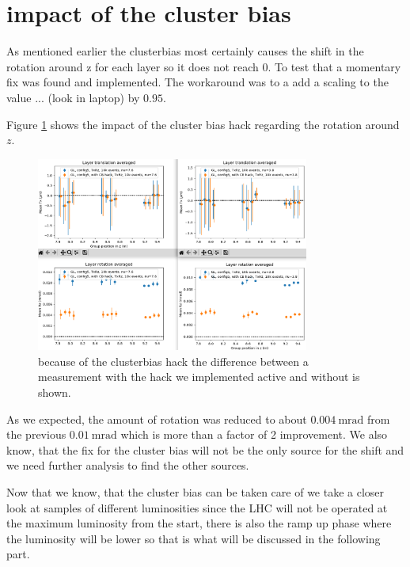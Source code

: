 \section{impact of the cluster bias}

As mentioned earlier the clusterbias most certainly causes the shift in the rotation around z for each layer so it does not reach 0.
To test that a momentary fix was found and implemented. The workaround was to a add a scaling to the value ... (look in laptop) by $\num{0.95}$.

Figure \ref{fig:cbhack_on_off} shows the impact of the cluster bias
hack regarding the rotation around $z$.

\begin{figure}
  \centering
  \includegraphics[width=0.8\textwidth]{plots/jan_24_2022/compare_with_without_hack.png}
  \caption{because of the clusterbias hack the difference between a measurement with the hack we implemented active and without is shown.}
  \label{fig:cbhack_on_off}
\end{figure}

As we expected, the amount of rotation was reduced to about
$\SI{0.004}{\milli\radian}$ from the previous $\SI{0.01}{\milli\radian}$ which is more than a factor of 2 improvement. We also know, that the fix for the cluster bias will not be the only source for the shift and we need further analysis to find the other sources.

Now that we know, that the cluster bias can be taken care of we take a closer look at samples of different luminosities since the LHC will not be operated at the maximum luminosity from the start, there is also the ramp up phase where the luminosity will be lower so that is what will be discussed in the following part.

